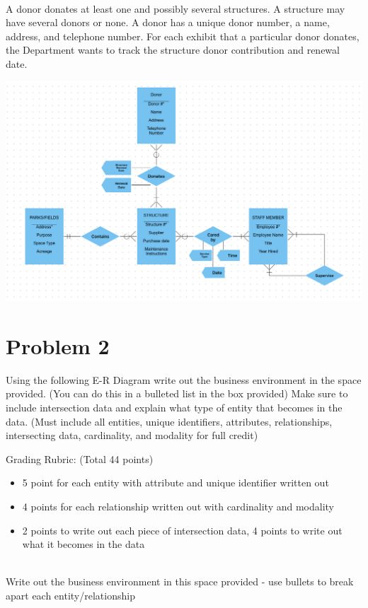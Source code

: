 \documentclass{article}
\begin{document}
\noindent\\
A donor donates at least one and possibly several structures. A structure may have several donors or none. A donor has a unique donor number, a name, address, and telephone number. For each exhibit that a particular donor donates, the Department wants to track the structure donor contribution and renewal date.

\begin{center}
    \includegraphics[width=\textwidth]{./images/Diagram.png}
\end{center}

\section*{Problem 2}
Using the following E-R Diagram write out the business environment in the space provided. (You can do this in a bulleted list in the box provided) Make sure to include intersection data and explain what type of entity that becomes in the data. (Must include all entities, unique identifiers, attributes, relationships, intersecting data, cardinality, and modality for full credit)

Grading Rubric: (Total 44 points)
\begin{itemize}
    \item 5 point for each entity with attribute and unique identifier written out
    \item 4 points for each relationship written out with cardinality and modality
    \item 2 points to write out each piece of intersection data, 4 points to write out what it becomes in the data
\end{itemize}

\noindent\\
Write out the business environment in this space provided - use bullets to break apart each entity/relationship
\end{document}

